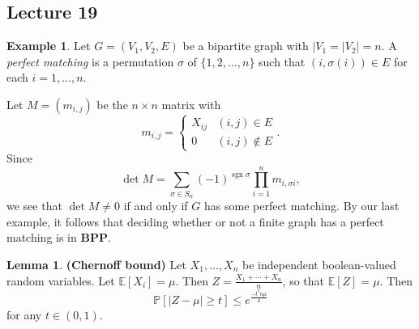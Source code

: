 \documentclass[10pt,letterpaper,cm]{nupset}
\theoremstyle{definition}
\newtheorem{exmp}{Example}
\newtheorem{lemma}{Lemma}
\newcommand{\1}{\mathbf{1}}
\newcommand{\0}{\vec 0}
\DeclareMathOperator{\sgn}{sgn}
\begin{document}
\subsection{Lecture 19}

\begin{exmp}
Let $G=(V_1, V_2, E)$ be a bipartite graph with $|V_1=|V_2|=n$. 
A \textit{perfect matching} is a permutation $\sigma$ of $\{1,2, \ldots, n\}$ such that $(i, \sigma(i)) \in E$ for each $i=1, \ldots, n$.

Let $M= (m_{i,j})$ be the $n\times n$ matrix with $$m_{i,j} = \begin{cases} X_{ij} & (i,j) \in E\\ 0 & (i,j) \notin E    \end{cases}.$$ Since $$\det{M} =  \sum_{\sigma \in S_n} ({-}1)^{\sgn{\sigma}} \prod_{i=1}^n m_{i, \sigma{i}} ,$$ we see that $\det{M} \ne 0$ if and only if $G$ has some perfect matching. By our last example, it follows that deciding whether or not a finite graph has a perfect matching is in $\mathbf{BPP}$.
\end{exmp}

\begin{lemma}{\textbf{(Chernoff bound)}}
Let $X_1, \ldots, X_n$ be independent boolean-valued random variables. Let $\mathbb{E}[X_i]= \mu$. Then $Z= \frac{X_1 + \cdots + X_n}{n}$, so that $\mathbb{E}[Z] = \mu$. Then $$\mathbb{P}[|Z - \mu| \geq t] \leq e^{\frac{{-}t^2n \mu}{4}}$$ for any $t\in (0,1)$.
\end{lemma}
\end{document}

